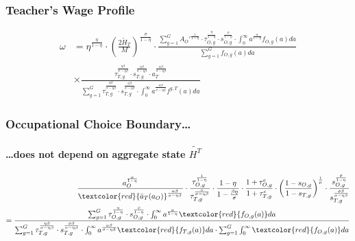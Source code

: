 \documentclass[11pt]{beamer}
\begin{document}
		\begin{frame}
			\frametitle{Teacher's Wage Profile} 
			\begin{align}
				\omega & = \eta^{\frac{\eta}{1-\eta}}\cdot \left(\tfrac{2\widetilde{H}_T}{M}\right)^{\frac{\sigma}{1-\eta}} \cdot \frac{\sum_{g=1}^G {A_O'}^\frac{1}{1-\eta}\cdot\tau_{O,g}^\frac{\eta}{1-\eta} \cdot s_{O,g}^\frac{\phi}{1-\eta}\cdot \int_0^\infty a^{\frac{\alpha}{1-\eta}} f_{O,g}(a)da}{\sum_{g=1}^G f_{O,g}(a)da} \nonumber\\
				& \times \frac{\tau_{T,g}^\frac{\eta\beta}{\sigma-\eta\beta } \cdot s_{T,g}^\frac{\phi\beta }{\sigma-\eta\beta } \cdot a_T^\frac{\alpha\beta }{\sigma-\eta\beta}}{\sum_{g=1}^G \tau_{T,g}^\frac{\eta\beta }{\sigma-\eta\beta } \cdot s_{T,g}^\frac{\phi\beta }{\sigma-\eta\beta } \cdot \int_0^\infty a^\frac{\alpha\beta}{\sigma-\eta\beta } f^{g,T}(a)da} \nonumber
			\end{align}
		\end{frame}
		
		
		\begin{frame}
			\frametitle{Occupational Choice Boundary\ldots}
			\framesubtitle{\ldots does not depend on aggregate state $\widetilde{H^T}$} 
			\footnotesize
			\begin{align*}
				\frac{a_O^{\frac{\alpha}{1-\eta}}}{\textcolor{red}{\bar{a}_T(a_O)}^{\frac{\alpha\beta}{\sigma-\eta\beta}}} \cdot \frac{\tau_{O,g}^\frac{1}{1-\eta}}{\tau_{T,g}^\frac{\sigma}{\sigma-\eta\beta}} \cdot \frac{1-\eta}{1-\tfrac{\beta \eta}{\sigma}} \cdot \frac{1+\tau^e_{O,g}}{1+\tau^e_{T,g}} \cdot \left(\frac{1-s_{O,g}}{1-s_{T,g}}\right)^\frac{1}{\mu} \cdot \frac{s_{O,g}^\frac{\phi}{1-\eta}}{s_{T,g}^\frac{\phi\beta}{\sigma-\eta\beta}} \nonumber\\
				= \frac{\sum_{g=1}^G \tau_{O,g}^\frac{\eta}{1-\eta} \cdot s_{O,g}^{\frac{\phi}{1-\eta}} \cdot \int_0^\infty a^{\frac{\alpha}{1-\eta}} \textcolor{red}{f_{O,g}(a)}da }{\sum_{g=1}^G \tau_{T,g}^\frac{\eta\beta}{\sigma-\eta\beta} \cdot s_{T,g}^\frac{\phi\beta}{\sigma-\eta\beta} \cdot \int_0^\infty a^{\frac{\alpha\beta}{\sigma-\eta\beta}} \textcolor{red}{f_{T,g}(a)}da \cdot \sum_{g=1}^G \int_0^\infty \textcolor{red}{f_{O,g}(a)}da  } \nonumber
			\end{align*}
		\end{frame}
		
\end{document}
